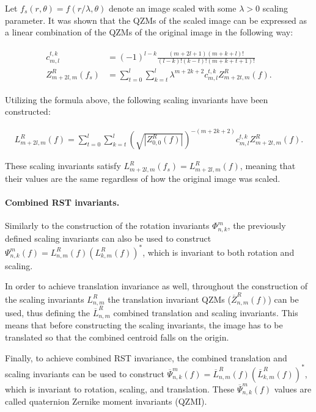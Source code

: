 Let $f_s(r,\theta) = f(r/\lambda, \theta)$ denote an image scaled with some $\lambda > 0$ scaling parameter. It was shown that the QZMs of the scaled image can be expressed as a linear combination of the QZMs of the original image in the following way:

\begin{gather*}
  \begin{split}
  c_{m,l}^{t,k} &= (-1)^{l-k}\frac{(m + 2l + 1)(m + k + l)!}{(l - k)!(k - t)!(m + k + t + 1)!} \\
  Z_{m + 2l,m}^R(f_s) &= \sum_{t=0}^l\sum_{k=t}^l\lambda^{m+2k+2}c_{m,l}^{t,k}Z_{m+2t,m}^R(f).
  \end{split}
\end{gather*}

Utilizing the formula above, the following scaling invariants have been constructed:


\begin{gather*}
    L_{m + 2l,m}^R(f) = \sum_{t=0}^l\sum_{k=t}^l\left(\sqrt{|Z_{0,0}^R(f)|}\right)^{-(m+2k+2)}c_{m,l}^{t,k}Z_{m+2t,m}^R(f).
\end{gather*}

These scaling invariants satisfy $L_{m + 2l,m}^R(f_s) = L_{m + 2l,m}^R(f)$, meaning that their values are the same regardless of how the original image was scaled.


\paragraph{Combined RST invariants.}
Similarly to the construction of the rotation invariants $\Phi_{n,k}^m$, the previously defined scaling invariants can also be used to construct $\Psi_{n,k}^m(f) = L_{n,m}^R(f)(L_{k,m}^R(f))^*$, which is invariant to both rotation and scaling.


In order to achieve translation invariance as well, throughout the construction of the scaling invariants $L_{n,m}^R$ the translation invariant QZMs ($\overline{Z}_{n,m}^R(f)$) can be used, thus defining the $\overline{L}_{n,m}^R$ combined translation and scaling invariants. This means that before constructing the scaling invariants, the image has to be translated so that the combined centroid falls on the origin.


Finally, to achieve combined RST invariance, the combined translation and scaling invariants can be used to construct $\overline{\Psi}_{n,k}^m(f) = \overline{L}_{n,m}^R(f)(\overline{L}_{k,m}^R(f))^*$, which is invariant to rotation, scaling, and translation. These $\overline{\Psi}_{n,k}^m(f)$ values are called quaternion Zernike moment invariants (QZMI).


